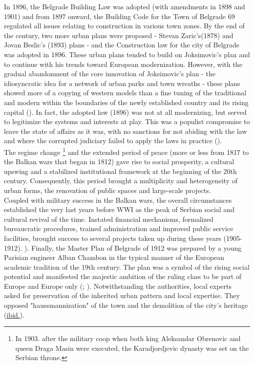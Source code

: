 \documentclass[11pt]{report}
\begin{document}
In 1896, the Belgrade Building Law was adopted (with amendments in 1898 and 1901) and from 1897 onward, the Building Code for the Town of Belgrade 69 regulated all issues relating to construction in various town zones.
By the end of the century, two more urban plans were proposed - Stevan Zaric’s(1878) and Jovan Beslic’s (1893) plans - and the Construction law for the city of Belgrade was adopted in 1896. These urban plans tended to build on Joksimovic’s plan and to continue with his trends toward European modernization.  However, with the gradual abandonment of the core innovation of Joksimovic’s plan - the idiosyncratic idea for a network of urban parks and town wreaths -	these plans showed more of a copying of western models than a fine tuning of the traditional and modern within the boundaries of the newly established country and its rising capital  (\href{Blagojevic}{\citealt{blagojevic_urban_2009}}). In fact, the adopted law (1896) was not at all modernizing, but served to legitimize the systems and interests at play.  This was a populist compromise to leave the state of affairs as it was, with no sanctions for not abiding with the law and where the corrupted judiciary failed to apply the laws in practice (\href{Stojanovic}{\citealt{stojanovic_kontroverze_2015}}). 
\\

The regime change
\footnote{In 1903. after the military coop when both king Aleksandar Obrenovic and queen Draga Masin were executed, the Karadjordjevic dynasty was set on the Serbian throne.}
and the extended period of peace (more or less from 1817  to the Balkan wars that began in 1812)  gave rise to social prosperity, a cultural upswing and a stabilized institutional framework at the beginning of the 20th century.   Consequently, this period brought a multiplicity and heterogeneity of urban forms, the renovation of public spaces and large-scale projects.
\\

Coupled with military success in the Balkan wars, the overall circumstances established the very  last  years  before  WWI  as the  peak  of  Serbian  social  and  cultural  revival  of  the  time. Instated  financial   mechanisms,   formalized  bureaucratic  procedures,   trained  administration  and  improved  public  service  facilities,  brought  success  to  several  projects  taken  up during  these  years  (1905-1912).
).   Finally,  the  Master  Plan  of  Belgrade of 1912  was  prepared  by  a  young  Parisian  engineer  Alban  Chambon  in  the  typical  manner of  the  European  academic  tradition  of  the  19th  century.   The  plan  was  a  symbol  of  the rising social potential and manifested the majestic ambition of the ruling class to be part  of  Europe  and  Europe  only   
(\href{Blagojevic}{\citealt{blagojevic_urban_2009}}; \href{Doytchinov}{\citealt{doytchinov_modernization_2015}}).
Notwithstanding the authorities, local experts asked for preservation of the inherited urban pattern and local expertise. They opposed "haussmannization" of the town and the demolition of the city's heritage (\href{ref}{ibid.}).
\\
\end{document}
